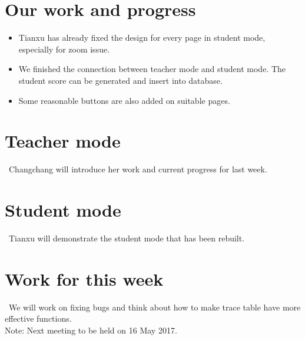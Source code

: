 \documentclass[11pt, a4paper]{article}
\begin{document}
\section{Our work and progress}
\begin {itemize} 
\item Tianxu has already fixed the design for every page in student mode, especially for zoom issue. 
\item We finished the connection between teacher mode and student mode. The student score can be generated and insert into database.
\item Some reasonable buttons are also added on suitable pages. 

\end {itemize}

\section{Teacher mode}
\ Changchang will introduce her work and current progress for last week.\\

\section{Student mode}
\ Tianxu will demonstrate the student mode that has been rebuilt.\\


\section{Work for this week}
\ We will work on fixing bugs and think about how to make trace table have more effective functions. \\


\vspace*{10pt}
\noindent Note: Next meeting to be held on 16 May 2017.
\end{document}
